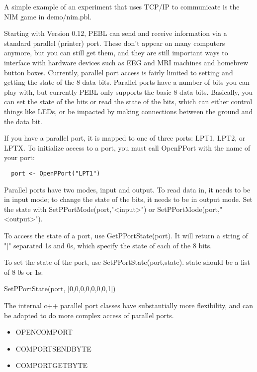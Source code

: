 A simple example of an experiment that uses TCP/IP to communicate is
the NIM game in  demo/nim.pbl.



Starting with Version 0.12, PEBL can send and receive information via a standard parallel (printer) port.    These don't appear on many computers anymore, but you can still get them, and they are still important ways to interface with hardware devices such as EEG and MRI machines and homebrew button boxes.  Currently, parallel port access is fairly limited to setting and getting the state of the 8 data bits.  Parallel ports have a number of bits you can play with, but currently PEBL only supports the basic 8 data bits.  Basically, you can set the state of the bits or read the state of the bits, which can either control things like LEDs, or be impacted by making connections between the ground and the data bit.


If you have a parallel port, it is mapped to one of three ports: LPT1, LPT2, or LPTX.  To initialize access to a port, you must call OpenPPort with the name of your port:
\begin{verbatim}
  port <- OpenPPort("LPT1")
\end{verbatim}

Parallel ports have two modes, input and output.  To read data in, it needs to be in input mode; to change the state of the bits, it needs to be in output mode.  Set the state with SetPPortMode(port,"<input>") or SetPPortMode(port,"<output>").

To access the state of a port, use GetPPortState(port).  It will return a string of "|" separated 1s and 0s, which specify the state of each of the 8 bits.

To set the state of the port, use SetPPortState(port,state).  state should be a list of 8 0s or 1s:

SetPPortState(port, [0,0,0,0,0,0,0,1])

The internal c++ parallel port classes have substantially more flexibility, and can be adapted to do more complex access of parallel ports.




\begin{itemize}
\item OPENCOMPORT
\item COMPORTSENDBYTE
\item COMPORTGETBYTE
\end{itemize}



